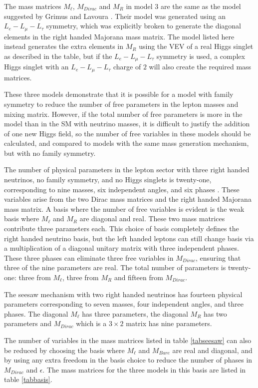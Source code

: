 \documentclass[nofootinbib,showpacs]{revtex4}
\begin{document}
The mass matrices $M_{\ell}$, $M_{Dirac}$ and $M_R$ in model 3 are the same as the model suggested by Grimus and Lavoura \cite{LavLmodel2}. Their model was generated using an $L_e-L_\mu-L_\tau$ symmetry, which was explicitly broken to generate the diagonal elements in the right handed Majorana mass matrix. The model listed here instead generates the extra elements in $M_R$ using the VEV of a real Higgs singlet as described in the table, but if the $L_e-L_\mu-L_\tau$ symmetry is used, a complex Higgs singlet with an $L_e-L_\mu-L_\tau$ charge of $2$ will also create the required mass matrices. 

These three models demonstrate that it is possible for a model with family symmetry to reduce the number of free parameters in the lepton masses and mixing matrix. However, if the total number of free parameters is more in the model than in the SM with neutrino masses, it is difficult to justify the addition of one new Higgs field, so the number of free variables in these models should be calculated, and compared to models with the same mass generation mechanism, but with no family symmetry.

The number of physical parameters in the lepton sector with three right handed neutrinos, no family symmetry, and no Higgs singlets is twenty-one, corresponding to nine masses, six independent angles, and six phases \cite{santamaria,jenkins}. These variables arise from the two Dirac mass matrices and the right handed Majorana mass matrix.
A basis where the number of free variables is evident is the weak basis where $M_\ell$ and $M_R$ are diagonal and real. These two mass matrices contribute three parameters each. 
This choice of basis completely defines the right handed neutrino basis, but the left handed leptons can still change basis via a multiplication of a diagonal unitary matrix with three independent phases. These three phases can eliminate three free variables in $M_{Dirac}$, ensuring that three of the nine parameters are real. The total number of parameters is twenty-one: three from $M_\ell$, three from $M_R$ and fifteen from $M_{Dirac}$. 

The seesaw mechanism with two right handed neutrinos has fourteen physical parameters corresponding to seven masses, four independent angles, and three phases. The diagonal $M_\ell$ has three parameters, the diagonal $M_R$ has two parameters and $M_{Dirac}$ which is a $3\times 2$ matrix has nine parameters.    


The number of variables in the mass matrices listed in table \ref{tabseesaw} can also be reduced by choosing the basis where $M_\ell$ and $M_{Bare}$ are real and diagonal, and by using any extra freedom in the basis choice to reduce the number of phases in $M_{Dirac}$ and $\epsilon$. The mass matrices for the three models in this basis are listed in table \ref{tabbasis}. 
\end{document}
